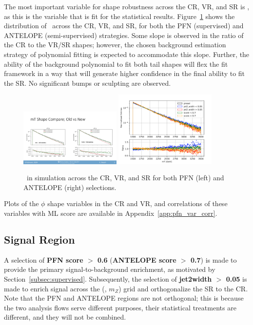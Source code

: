 The most important variable for shape robustness across the CR, VR, and SR is \mt, as this is the variable that is fit for the statistical results.
Figure~\ref{fig:crvrsr_mt} shows the distribution of \mt~across the CR, VR, and SR, for both the PFN (supervised) and ANTELOPE (semi-supervised) strategies.
Some slope is observed in the ratio of the CR to the VR/SR shapes; however, the chosen background estimation strategy of polynomial fitting is expected to accommodate this slope.
Further, the ability of the background polynomial to fit both tail shapes will flex the fit framework in a way that will generate higher confidence in the final ability to fit the SR.
No significant bumps or sculpting are observed.%
\begin{figure}[!htbp]
\centering
   \includegraphics[width=0.45\textwidth]{figures/eventsel/PFN_mT_regions}
   \includegraphics[width=0.45\textwidth]{figures/eventsel/antelope_mT_regions}
    \caption{\mt~in simulation across the CR, VR, and SR for both PFN (left) and ANTELOPE (right) selections. 
    \label{fig:crvrsr_mt}}
\end{figure}

Plots of the $\phi$ shape variables in the CR and VR, and correlations of these variables with ML score are available in Appendix~\ref{app:pfn_var_corr}. 


\subsection{Signal Region}
\label{subec:sel_sr}

A selection of \textbf{PFN score $>$ 0.6} (\textbf{ANTELOPE score $>$ 0.7}) is made to provide the primary signal-to-background enrichment, as motivated by Section~\ref{subsec:supervised}.
Subsequently, the selection of \textbf{jet2width $>$ 0.05} is made to enrich signal across the (\rinv, $m_Z$) grid and orthogonalize the SR to the CR.
Note that the PFN and ANTELOPE regions are not orthogonal; this is because the two analysis flows serve different purposes, their statistical treatments are different, and they will not be combined. 

